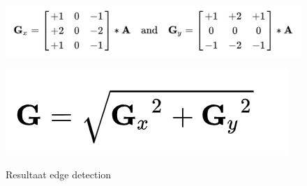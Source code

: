 \documentclass[11pt,twoside,a4paper]{article}
\begin{document}
\begin{figure}[H]
    \centering
    \includegraphics[scale=0.3]{1.png}
    \caption*{}
    \label{fig:formule1}
\end{figure}

\begin{figure}[H]
    \centering
    \includegraphics[scale=0.3]{2.png}
    \caption*{\cite{sobel}}
    \label{fig:formule2}
\end{figure}


\begin{figure}[h!]
    \centering
    \hfill
    \caption{Resultaat edge detection}
    \label{fig:edge_dection}
\end{figure}
\end{document}
